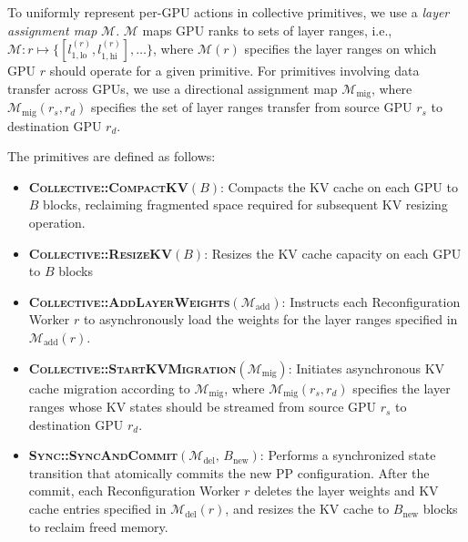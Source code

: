 \documentclass[sigplan,screen]{acmart}
\begin{document}
To uniformly represent per-GPU actions in collective primitives, we use a
\emph{layer assignment map} $\mathcal{M}$. $\mathcal{M}$ maps GPU ranks to sets of
layer ranges, i.e.,
$\mathcal{M} : r \mapsto \{[l^{(r)}_{1,\text{lo}}, l^{(r)}_{1,\text{hi}}], \dots\}$,
where $\mathcal{M}(r)$ specifies the layer ranges on which GPU $r$ should operate
for a given primitive. For primitives involving data transfer across GPUs, we
use a directional assignment map $\mathcal{M}_{\text{mig}}$, where
$\mathcal{M}_{\text{mig}}(r_s, r_d)$ specifies the set of layer ranges transfer from source GPU $r_s$ to destination GPU $r_d$.

The primitives are defined as follows:

\begin{itemize}

    \item \textbf{\textsc{Collective::CompactKV}$(B)$}:  
    Compacts the KV cache on each GPU to $B$ blocks, reclaiming fragmented space required for subsequent KV resizing operation.
    
    \item \textbf{\textsc{Collective::ResizeKV}$(B)$}:  
    Resizes the KV cache capacity on each GPU to $B$ blocks
    
    \item \textbf{\textsc{Collective::AddLayerWeights}$(\mathcal{M}_{\text{add}})$}:  
    Instructs each Reconfiguration Worker $r$ to asynchronously load the weights
    for the layer ranges specified in $\mathcal{M}_{\text{add}}(r)$. 

    \item \textbf{\textsc{Collective::StartKVMigration}$(\mathcal{M}_{\text{mig}})$}:  
    Initiates asynchronous KV cache migration according to
    $\mathcal{M}_{\text{mig}}$, where $\mathcal{M}_{\text{mig}}(r_s, r_d)$ specifies
    the layer ranges whose KV states should be streamed from source GPU $r_s$ to
    destination GPU $r_d$.

    \item \textbf{\textsc{Sync::SyncAndCommit}$(\mathcal{M}_{\text{del}},\, B_{\text{new}})$}:  
    Performs a synchronized state transition that atomically commits the new PP
    configuration. After the commit, each Reconfiguration Worker $r$ deletes the
    layer weights and KV cache entries specified in $\mathcal{M}_{\text{del}}(r)$,
    and resizes the KV cache to $B_{\text{new}}$ blocks to reclaim freed memory.

\end{itemize}
\end{document}
